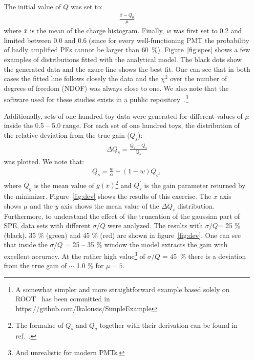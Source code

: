 \documentclass[preprint,12pt]{elsarticle}
\begin{document}
The initial value of $Q$ was set to: 
\begin{align}
\frac{ \bar x - Q_0 }{\mu}
\label{eq:laestim}
\end{align}
where $\bar x$ is the mean of the charge histogram. 
Finally, $w$ was first set to 0.2 and limited between 0.0 and 0.6 (since for every well-functioning PMT the probability of badly amplified PEs cannot be larger than 60~\%).
Figure~\ref{fig:spes} shows a few examples of distributions fitted with the analytical model. 
The black dots show the generated data and the azure line shows the best fit. 
One can see that in both cases the fitted line follows closely the data and the $\chi^2$ over the number of degrees of freedom (NDOF) was always close to one. 
We also note that the software used for these studies exists in a public repository~\cite{git}.\footnote{%
A somewhat simpler and more straightforward example based solely on ROOT~\cite{root} has been committed in https://github.com/lkalousis/SimpleExample}

Additionally, sets of one hundred toy data were generated for different values of $\mu$ inside the 0.5 -- 5.0 range. 
For each set of one hundred toys, the distribution of the relative deviation from the true gain ($Q_s$):
\begin{align}
\Delta Q_s = \frac{ Q_s^\prime - Q_s }{ Q_s }
\label{eq:laestim}
\end{align}
was plotted. We note that:
\begin{align}
 Q_s = \frac{w}{\alpha} + (1-w)Q_g,
\label{eq:laestim}
\end{align}
where $Q_g$ is the mean value of $g(x)$\footnote{The formulae of $Q_s$ and $Q_g$ together with their derivation can be found in ref.~\cite{me2}. } and $Q_s^\prime$ is the gain parameter returned by the minimizer.
Figure~\ref{fig:dev} shows the results of this exercise. 
The $x$ axis shows $\mu$ and the $y$ axis shows the mean value of the $\Delta Q_s$ distribution. 
Furthermore, to understand the effect of the truncation of the gaussian part of SPE,  data sets with different $\sigma/Q$ were analyzed. 
The results with $\sigma/Q$= 25 \% (black), 35 \% (green) and 45 \% (red) are shown in figure~\ref{fig:dev}. 
One can see that inside the $\sigma/Q$ = 25 -- 35 \% window the model extracts the gain with excellent accuracy. 
At the rather high value\footnote{And unrealistic for modern PMTs.} of $\sigma/Q$ = 45~\% there is a deviation from the true gain of $\sim$ 1.0 \% for $\mu = 5$.
\end{document}
